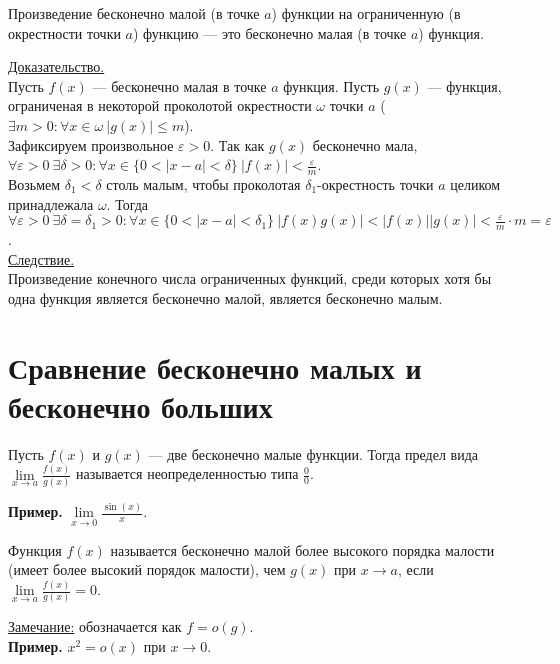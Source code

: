 \documentclass{article}
\begin{document}
\begin{theorem}
    Произведение бесконечно малой (в точке \(a\)) функции на ограниченную (в окрестности точки \(a\)) функцию --- это бесконечно малая (в точке \(a\)) функция.
\end{theorem}
\noindent
\underline{Доказательство.}\\
Пусть \(f(x)\) --- бесконечно малая в точке \(a\) функция. Пусть \(g(x)\) --- функция, ограниченая в некоторой проколотой окрестности \(\omega\) точки \(a\) (\(\displaystyle \exists m > 0 : \forall x \in \omega\ \vert g(x) \vert \leq m\)).\\
Зафиксируем произвольное \(\displaystyle \varepsilon > 0\). Так как \(g(x)\) бесконечно мала, \(\displaystyle \forall \varepsilon > 0\ \exists \delta > 0: \forall x \in \{0 < \vert x - a \vert < \delta\}\ \vert f(x) \vert < \frac{\varepsilon}{m}\).\\
Возьмем \(\delta_{1} < \delta \) столь малым, чтобы проколотая \(\delta_{1}\)-окрестность точки \(a\) целиком принадлежала \(\omega \).
Тогда \(\displaystyle \forall \varepsilon > 0\ \exists \delta = \delta_{1} > 0: \forall x \in \{0 < \vert x - a \vert < \delta_{1}\}\ \vert f(x)g(x) \vert < \vert f(x) \vert \vert g(x) \vert < \frac{\varepsilon}{m} \cdot m = \varepsilon\).\\        
\underline{Следствие.}\\
Произведение конечного числа ограниченных функций, среди которых хотя бы одна функция является бесконечно малой, является бесконечно малым.

\section{Сравнение бесконечно малых и бесконечно больших}
\begin{definition}
    Пусть \(f(x)\) и \(g(x)\) --- две бесконечно малые функции. Тогда предел вида \(\displaystyle \lim\limits_{x \to a} \frac{f(x)}{g(x)}\) называется неопределенностью типа \(\displaystyle \frac{0}{0}\).    
\end{definition}
\noindent
\textbf{Пример.} \(\displaystyle \lim\limits_{x \to 0} \frac{\sin(x)}{x}\).

\begin{definition}
    Функция \(f(x)\) называется бесконечно малой более высокого порядка малости (имеет более высокий порядок малости), чем \(g(x)\) при \(x \to a\), если \(\displaystyle \lim\limits_{x \to a}\frac{f(x)}{g(x)} = 0\).   
\end{definition}
\noindent
\underline{Замечание:} обозначается как \(f = o(g)\).\\
\textbf{Пример.} \(x^2 = o(x)\) при \(x \to 0\).
\end{document}
